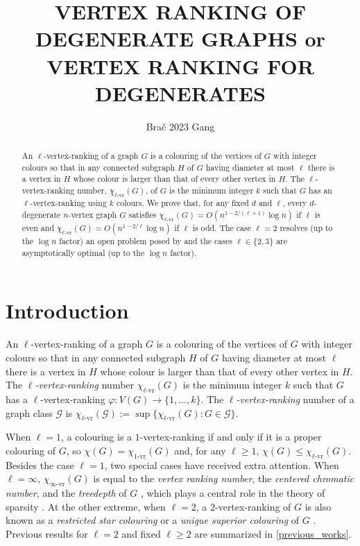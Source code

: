 \documentclass{patmorin}
\title{\MakeUppercase{Vertex Ranking of Degenerate Graphs} \newline or \MakeUppercase{Vertex Ranking for Degenerates}}
\author{Bra\v{c} 2023 Gang}
\newcommand{\defin}[1]{\emph{\color{brightmaroon}#1}}
\newcommand{\rn}[1]{\chi_{\operatorname{#1-vr}}}
\newcommand{\lrn}{\rn{\ell}}
\begin{document}
\maketitle

\begin{abstract}
  An $\ell$-vertex-ranking of a graph $G$ is a colouring of the vertices of $G$ with integer colours so that in any connected subgraph $H$ of $G$ having diameter at most $\ell$ there is a vertex in $H$ whose colour is larger than that of every other vertex in $H$.  The $\ell$-vertex-ranking number, $\lrn(G)$, of $G$ is the minimum integer $k$ such that $G$ has an $\ell$-vertex-ranking using $k$ colours.  We prove that, for any fixed $d$ and $\ell$, every $d$-degenerate $n$-vertex graph $G$ satisfies $\lrn(G)= O(n^{1-2/(\ell+1)}\log n)$ if $\ell$ is even and $\lrn(G)= O(n^{1-2/\ell}\log n)$ if $\ell$ is odd. The case $\ell=2$ resolves (up to the $\log n$ factor) an open problem posed by \citet{karpas.neiman.ea:on} and the cases $\ell\in\{2,3\}$ are asymptotically optimal (up to the $\log n$ factor).
\end{abstract}


\section{Introduction}

An $\ell$-vertex-ranking of a graph $G$ is a colouring of the vertices of $G$ with integer colours so that in any connected subgraph $H$ of $G$ having diameter at most $\ell$ there is a vertex in $H$ whose colour is larger than that of every other vertex in $H$.  The \defin{$\ell$-vertex-ranking} number $\lrn(G)$ is the minimum integer $k$ such that $G$ has a $\ell$-vertex-ranking $\varphi:V(G)\to\{1,\ldots,k\}$. The \defin{$\ell$-vertex-ranking} number of a graph class $\mathcal{G}$ is $\lrn(\mathcal{G}):=\sup\{\lrn(G):G\in\mathcal{G}\}$.



When $\ell=1$, a colouring is a $1$-vertex-ranking if and only if it is a proper colouring of $G$, so $\chi(G)=\rn{1}(G)$ and, for any $\ell\ge 1$, $\chi(G)\le \lrn(G)$.  Besides the case $\ell=1$, two special cases have received extra attention.  When $\ell=\infty$, $\rn{\infty}(G)$ is equal to the \defin{vertex ranking number}, the \defin{centered chromatic number}, and the \defin{treedepth} of $G$
\cite{nesetril.ossona:tree-depth},
which plays a central role in the theory of sparsity \cite{nesetril.ossona:sparsity}.
At the other extreme, when $\ell=2$, a $2$-vertex-ranking of $G$ is also known as a \defin{restricted star colouring} \cite{shalu.antony:complexity} or a \defin{unique superior colouring} of $G$ \cite{karpas.neiman.ea:on}.  Previous results for $\ell=2$ and fixed $\ell\ge 2$ are summarized in \cref{previous_works}.
\end{document}
